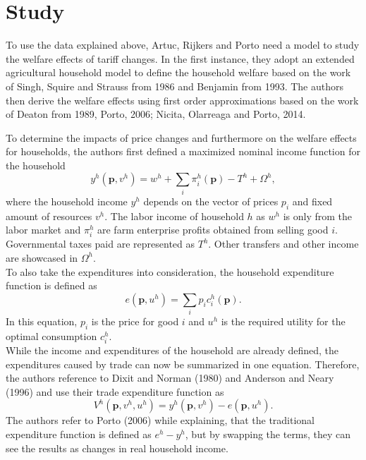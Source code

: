 \chapter{Study}

To use the data explained above, Artuc, Rijkers and Porto need a model to study the welfare effects of tariff changes. In the
first instance, they adopt an extended agricultural household model to define the household welfare based on the work of Singh, 
Squire and Strauss from 1986 and Benjamin from 1993. The authors then derive the welfare effects using first order
approximations based on the work of Deaton from 1989, Porto, 2006; Nicita, Olarreaga and Porto, 2014.

To determine the impacts of price changes and furthermore on the welfare effects for households, the authors first defined a 
maximized nominal income function for the household 
\begin{equation} \label{eq:equation1}
    y^h(\mathbf{p}, v^h)= w^h + \sum_{ i}\pi_{i}^{h}(\mathbf{p})-T^h+\Omega^h,
\end{equation}
where the household income \(y^h\) depends on the vector of prices \(p_{i}\) and fixed amount of resources \(v^h\).
The labor income of household \(h\) as \(w^h\) is only from the labor market and \(\pi_{i}^{h}\) are farm enterprise profits
obtained from selling good \(i\).  Governmental taxes paid are represented as \(T^h\). Other transfers and other income are
showcased in \(\Omega^h\). \\
To also take the expenditures into consideration, the household expenditure function is defined as 
\begin{equation} \label{eq:equation2}
    e(\mathbf{p}, u^h)= \sum_{i}p_{i}c_{i}^h(\mathbf{p}).
\end{equation}
In this equation, \(p_{i}\) is the price for good \(i\) and \(u^h\) is the required utility for the optimal consumption
\(c_{i}^h\).\\
While the income and expenditures of the household are already defined, the expenditures caused by trade can now be summarized
in one equation. Therefore, the authors reference to Dixit and Norman (1980) and Anderson and Neary (1996) and use their
trade expenditure function as 
\begin{equation} \label{eq:equation3}
    V^h(\mathbf{p}, v^h, u^h)= y^h(\mathbf{p}, v^h) - e(\mathbf{p}, u^h).
\end{equation} 
The authors refer to Porto (2006) while explaining, that the traditional expenditure function is defined as \(e^h-y^h\), but
by swapping the terms, they can see the results as changes in real household income.\\

